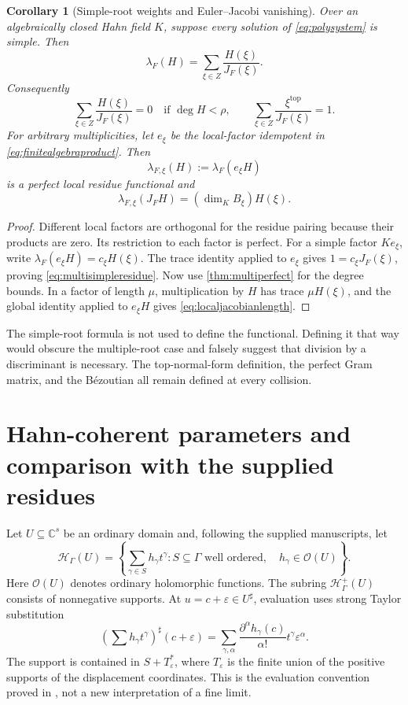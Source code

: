 \documentclass[11pt,letterpaper,oneside]{article}
\numberwithin{equation}{section}
\newtheorem{corollary}[theorem]{Corollary}
\theoremstyle{definition}
\theoremstyle{remark}\newtheorem{remark}[theorem]{Remark}
\newcommand{\C}{\mathbb C}\newcommand{\R}{\mathbb R}\newcommand{\Q}{\mathbb Q}
\newcommand{\OO}{\mathcal O}\newcommand{\mm}{\mathfrak m}
\newcommand{\HH}{\mathcal H_\Gamma}\newcommand{\Hp}{\mathcal H^+_\Gamma}
\newcommand{\sh}{^{\sharp}}
\begin{document}
\begin{corollary}[Simple-root weights and Euler--Jacobi vanishing]\label{cor:eulerjacobi}
Over an algebraically closed Hahn field $K$, suppose every solution of
\eqref{eq:polysystem} is simple. Then
\begin{equation}\label{eq:multisimpleresidue}
 \lambda_F(H)=\sum_{\xi\in Z}\frac{H(\xi)}{J_F(\xi)}.
\end{equation}
Consequently
\begin{equation}\label{eq:eulerjacobi}
 \sum_{\xi\in Z}\frac{H(\xi)}{J_F(\xi)}=0
 \quad\text{if }\deg H<\rho,
 \qquad
 \sum_{\xi\in Z}\frac{\xi^{\mathrm{top}}}{J_F(\xi)}=1.
\end{equation}
For arbitrary multiplicities, let $e_\xi$ be the local-factor idempotent
in \eqref{eq:finitealgebraproduct}. Then
\[
 \lambda_{F,\xi}(H):=\lambda_F(e_\xi H)
\]
is a perfect local residue functional and
\begin{equation}\label{eq:localjacobianlength}
 \lambda_{F,\xi}(J_FH)=(\dim_KB_\xi)H(\xi).
\end{equation}
\end{corollary}
\begin{proof}
Different local factors are orthogonal for the residue pairing because
their products are zero. Its restriction to each factor is perfect.
For a simple factor $K e_\xi$, write
$\lambda_F(e_\xi H)=c_\xi H(\xi)$. The trace identity applied to
$e_\xi$ gives $1=c_\xi J_F(\xi)$, proving
\eqref{eq:multisimpleresidue}. Now use \cref{thm:multiperfect} for the
degree bounds. In a factor of length $\mu$, multiplication by $H$
has trace $\mu H(\xi)$, and the global identity applied to $e_\xi H$
gives \eqref{eq:localjacobianlength}.
\end{proof}
The simple-root formula is not used to define the functional. Defining it
that way would obscure the multiple-root case and falsely suggest that
division by a discriminant is necessary. The top-normal-form definition,
the perfect Gram matrix, and the B\'ezoutian all remain defined at every
collision.

\section{Hahn-coherent parameters and comparison with the supplied residues}\label{sec:comparison}
Let $U\subseteq\C^s$ be an ordinary domain and, following the supplied
manuscripts, let
\[
 \HH(U)=\left\{\sum_{\gamma\in S}h_\gamma t^\gamma:
 S\subseteq\Gamma\text{ well ordered},\quad h_\gamma\in\OO(U)\right\}.
\]
Here $\OO(U)$ denotes ordinary holomorphic functions. The subring
$\Hp(U)$ consists of nonnegative supports. At $u=c+\varepsilon\in U\sh$,
evaluation uses strong Taylor substitution
\[
 \left(\sum h_\gamma t^\gamma\right)^{\sharp}(c+\varepsilon)
 =\sum_{\gamma,\alpha}
 \frac{\partial^\alpha h_\gamma(c)}{\alpha!}
 t^\gamma\varepsilon^\alpha.
\]
The support is contained in $S+T_\varepsilon^*$, where
$T_\varepsilon$ is the finite union of the positive supports of the
displacement coordinates. This is the evaluation convention proved in
\cite{SourceAnalysis,SourceResearch}, not a new interpretation of a fine
limit.
\end{document}
